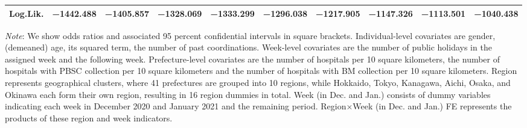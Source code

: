\documentclass[12pt, a4paper]{article}
\begin{document}
\begin{landscape}
\begin{table}[H]
\begin{threeparttable}
\begin{tabular}[t]{lccccccccc}
Log.Lik. & \num{-1442.488} & \num{-1405.857} & \num{-1328.069} & \num{-1333.299} & \num{-1296.038} & \num{-1217.905} & \num{-1147.326} & \num{-1113.501} & \num{-1040.438}\\
\bottomrule
\end{tabular}
\begin{tablenotes}
\item \emph{Note}: We show odds ratios and associated 95 percent confidential intervals in square brackets. Individual-level covariates are gender, (demeaned) age, its squared term, the number of past coordinations. Week-level covariates are the number of public holidays in the assigned week and the following week. Prefecture-level covariates are the number of hospitals per 10 square kilometers, the number of hospitals with PBSC collection per 10 square kilometers and the number of hospitals with BM collection per 10 square kilometers. Region represents geographical clusters, where 41 prefectures are grouped into 10 regions, while Hokkaido, Tokyo, Kanagawa, Aichi, Osaka, and Okinawa each form their own region, resulting in 16 region dummies in total. Week (in Dec. and Jan.) consists of dummy variables indicating each week in December 2020 and January 2021 and the remaining period. Region$\times$Week (in Dec. and Jan.) FE represents the products of these region and week indicators.
\end{tablenotes}
\end{threeparttable}
\end{table}
\end{landscape}
\end{document}
